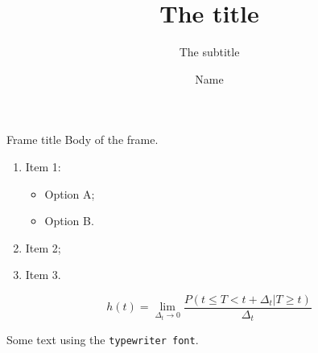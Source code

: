 \documentclass{beamer}
\title{The title}
\subtitle{The subtitle}
\author{Name}
\begin{document}
\begin{frame}
	\titlepage
\end{frame}

\begin{frame}{Frame title}
	Body of the frame.

	\begin{enumerate}
		\item Item 1:
		\begin{itemize}
			\item Option A;
			\item Option B.
		\end{itemize}
		\item Item 2;
		\item Item 3.
	\end{enumerate}

	\[
		h(t) = \lim_{\Delta_t \to 0} \frac{P(t \le T < t + \Delta_t | T \ge t)}{\Delta_t}
	\]

	Some text using the \texttt{typewriter font}.

\end{frame}
\end{document}

